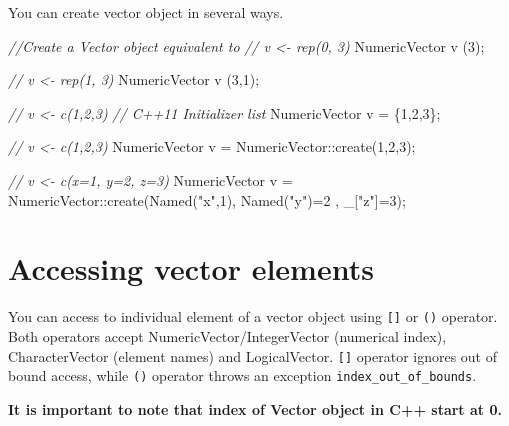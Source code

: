 \documentclass[]{book}
\newenvironment{Shaded}{\begin{snugshade}}{\end{snugshade}}
\newcommand{\CommentTok}[1]{\textcolor[rgb]{0.56,0.35,0.01}{\textit{#1}}}
\newcommand{\DecValTok}[1]{\textcolor[rgb]{0.00,0.00,0.81}{#1}}
\newcommand{\NormalTok}[1]{#1}
\newcommand{\StringTok}[1]{\textcolor[rgb]{0.31,0.60,0.02}{#1}}
\begin{document}
You can create vector object in several ways.

\begin{Shaded}
\begin{Highlighting}[]
\CommentTok{//Create a Vector object equivalent to}
\CommentTok{// v <- rep(0, 3)}
\NormalTok{NumericVector v (}\DecValTok{3}\NormalTok{);}

\CommentTok{// v <- rep(1, 3)}
\NormalTok{NumericVector v (}\DecValTok{3}\NormalTok{,}\DecValTok{1}\NormalTok{);}

\CommentTok{// v <- c(1,2,3) }
\CommentTok{// C++11 Initializer list}
\NormalTok{NumericVector v = \{}\DecValTok{1}\NormalTok{,}\DecValTok{2}\NormalTok{,}\DecValTok{3}\NormalTok{\}; }

\CommentTok{// v <- c(1,2,3)}
\NormalTok{NumericVector v = NumericVector::create(}\DecValTok{1}\NormalTok{,}\DecValTok{2}\NormalTok{,}\DecValTok{3}\NormalTok{);}

\CommentTok{// v <- c(x=1, y=2, z=3)}
\NormalTok{NumericVector v =}
\NormalTok{  NumericVector::create(Named(}\StringTok{"x"}\NormalTok{,}\DecValTok{1}\NormalTok{), Named(}\StringTok{"y"}\NormalTok{)=}\DecValTok{2}\NormalTok{ , _[}\StringTok{"z"}\NormalTok{]=}\DecValTok{3}\NormalTok{);}
\end{Highlighting}
\end{Shaded}

\hypertarget{accessing-vector-elements}{%
\section{Accessing vector elements}\label{accessing-vector-elements}}

You can access to individual element of a vector object using \texttt{{[}{]}} or \texttt{()} operator. Both operators accept NumericVector/IntegerVector (numerical index), CharacterVector (element names) and LogicalVector. \texttt{{[}{]}} operator ignores out of bound access, while \texttt{()} operator throws an exception \texttt{index\_out\_of\_bounds}.

\textbf{It is important to note that index of Vector object in C++ start at 0.}
\end{document}
